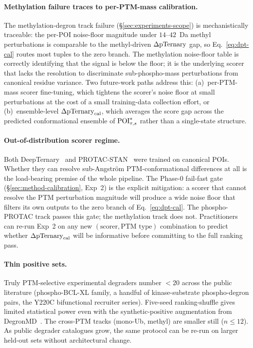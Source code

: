 \paragraph{Methylation failure traces to per-PTM-mass calibration.} The methylation-degron track failure (\S\ref{sec:experiments-scope}) is mechanistically traceable: the per-POI noise-floor magnitude under $14$--$42$~Da methyl perturbations is comparable to the methyl-driven $\Delta\mathrm{pTernary}$ gap, so Eq.~\ref{eq:dpt-cal} routes most tuples to the zero branch. The methylation noise-floor table is correctly identifying that the signal is below the floor; it is the underlying scorer that lacks the resolution to discriminate sub-phospho-mass perturbations from canonical residue variance. Two future-work paths address this: (a)~per-PTM-mass scorer fine-tuning, which tightens the scorer's noise floor at small perturbations at the cost of a small training-data collection effort, or (b)~ensemble-level $\Delta\mathrm{pTernary}_{\mathrm{cal}}$, which averages the score gap across the predicted conformational ensemble of $\mathrm{POI}^{*}_{\tau,s}$ rather than a single-state structure.

\paragraph{Out-of-distribution scorer regime.} Both DeepTernary~\cite{deepternary-2025} and PROTAC-STAN~\cite{protac-stan-2025} were trained on canonical POIs. Whether they can resolve sub-Angstr\"om PTM-conformational differences at all is the load-bearing premise of the whole pipeline. The Phase-0 fail-fast gate (\S\ref{sec:method-calibration}, Exp~2) is the explicit mitigation: a scorer that cannot resolve the PTM perturbation magnitude will produce a wide noise floor that filters its own outputs to the zero branch of Eq.~\ref{eq:dpt-cal}. The phospho-PROTAC track passes this gate; the methylation track does not. Practitioners can re-run Exp~2 on any new $(\text{scorer}, \text{PTM type})$ combination to predict whether $\Delta\mathrm{pTernary}_{\mathrm{cal}}$ will be informative before committing to the full ranking pass.

\paragraph{Thin positive sets.} Truly PTM-selective experimental degraders number $< 20$ across the public literature (phospho-BCL-XL family, a handful of kinase-substrate phospho-degron pairs, the Y220C bifunctional recruiter series). Five-seed ranking-shuffle gives limited statistical power even with the synthetic-positive augmentation from DegronMD~\cite{degronmd-2024}. The cross-PTM tracks (mono-Ub, methyl) are smaller still ($n \leq 12$). As public degrader catalogues grow, the same protocol can be re-run on larger held-out sets without architectural change.

